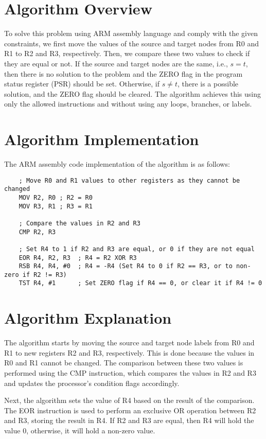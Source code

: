\section{Algorithm Overview}

To solve this problem using ARM assembly language and comply with the given constraints, we first move the values of the source and target nodes from R0 and R1 to R2 and R3, respectively. Then, we compare these two values to check if they are equal or not. If the source and target nodes are the same, i.e., $s=t$, then there is no solution to the problem and the ZERO flag in the program status register (PSR) should be set. Otherwise, if $s \neq t$, there is a possible solution, and the ZERO flag should be cleared. The algorithm achieves this using only the allowed instructions and without using any loops, branches, or labels.

\section{Algorithm Implementation}

The ARM assembly code implementation of the algorithm is as follows:

\begin{verbatim}
    ; Move R0 and R1 values to other registers as they cannot be changed
    MOV R2, R0 ; R2 = R0
    MOV R3, R1 ; R3 = R1

    ; Compare the values in R2 and R3
    CMP R2, R3

    ; Set R4 to 1 if R2 and R3 are equal, or 0 if they are not equal
    EOR R4, R2, R3  ; R4 = R2 XOR R3
    RSB R4, R4, #0  ; R4 = -R4 (Set R4 to 0 if R2 == R3, or to non-zero if R2 != R3)
    TST R4, #1      ; Set ZERO flag if R4 == 0, or clear it if R4 != 0
\end{verbatim}

\section{Algorithm Explanation}

The algorithm starts by moving the source and target node labels from R0 and R1 to new registers R2 and R3, respectively. This is done because the values in R0 and R1 cannot be changed. The comparison between these two values is performed using the CMP instruction, which compares the values in R2 and R3 and updates the processor's condition flags accordingly.

Next, the algorithm sets the value of R4 based on the result of the comparison. The EOR instruction is used to perform an exclusive OR operation between R2 and R3, storing the result in R4. If R2 and R3 are equal, then R4 will hold the value $0$, otherwise, it will hold a non-zero value.


